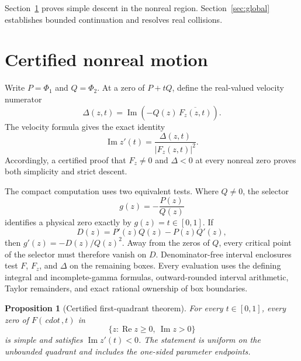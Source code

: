 \documentclass[11pt,a4paper]{amsart}
\newtheorem{proposition}[theorem]{Proposition}
\theoremstyle{definition}
\theoremstyle{remark}
\newcommand{\PhiOne}{\Phi_{1}}
\newcommand{\PhiTwo}{\Phi_{2}}
\begin{document}
Section~\ref{sec:motion} proves simple descent in the nonreal region.
Section~\ref{sec:global} establishes bounded continuation and resolves real
collisions.

\section{Certified nonreal motion}\label{sec:motion}

Write $P=\PhiOne$ and $Q=\PhiTwo$.  At a zero of $P+tQ$, define the real-valued velocity numerator
\begin{equation}\label{eq:delta}
 \Delta(z,t)=\operatorname{Im}\!\left(-Q(z)\,\overline{F_z(z,t)}\right).
\end{equation}
The velocity formula gives the exact identity
\begin{equation}\label{eq:velocity-delta}
 \operatorname{Im}z'(t)=\frac{\Delta(z,t)}{|F_z(z,t)|^2}.
\end{equation}
Accordingly, a certified proof that $F_z\neq0$ and $\Delta<0$ at every nonreal zero proves both simplicity and strict descent.

The compact computation uses two equivalent tests.  Where $Q\neq0$, the selector
\begin{equation}\label{eq:selector}
 g(z)=-\frac{P(z)}{Q(z)}
\end{equation}
identifies a physical zero exactly by $g(z)=t\in[0,1]$.  If
\begin{equation}\label{eq:D}
 D(z)=P'(z)Q(z)-P(z)Q'(z),
\end{equation}
then $g'(z)=-D(z)/Q(z)^2$.  Away from the zeros of $Q$, every critical
point of the selector must therefore vanish on $D$.  Denominator-free
interval enclosures test $F$, $F_z$, and $\Delta$ on the remaining boxes.
Every evaluation uses the defining integral and incomplete-gamma formulas,
outward-rounded interval arithmetic, Taylor remainders, and exact rational
ownership of box boundaries.

\begin{proposition}[Certified first-quadrant theorem]\label{prop:certificate}
For every $t\in[0,1]$, every zero of $F(\,cdot\,,t)$ in
\[
  \{z:\operatorname{Re}z\geq0,\ \operatorname{Im}z>0\}
\]
is simple and satisfies $\operatorname{Im}z'(t)<0$.  The statement is uniform on the unbounded quadrant and includes the one-sided parameter endpoints.
\end{proposition}
\end{document}
